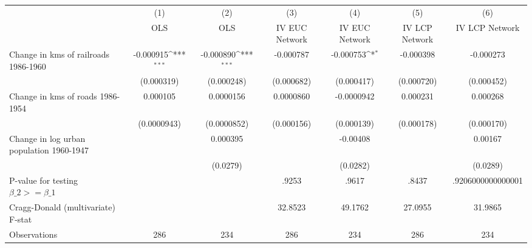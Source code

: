 {
\def\sym#1{\ifmmode^{#1}\else\(^{#1}\)\fi}
\begin{tabular}{l*{6}{c}}
\hline\hline
                &\multicolumn{1}{c}{(1)}&\multicolumn{1}{c}{(2)}&\multicolumn{1}{c}{(3)}&\multicolumn{1}{c}{(4)}&\multicolumn{1}{c}{(5)}&\multicolumn{1}{c}{(6)}\\
                &\multicolumn{1}{c}{OLS}&\multicolumn{1}{c}{OLS}&\multicolumn{1}{c}{IV EUC Network}&\multicolumn{1}{c}{IV EUC Network}&\multicolumn{1}{c}{IV LCP Network}&\multicolumn{1}{c}{IV LCP Network}\\
\hline
Change in kms of railroads 1986-1960&-0.000915\sym{***}&-0.000890\sym{***}&-0.000787         &-0.000753\sym{*}  &-0.000398         &-0.000273         \\
                &(0.000319)         &(0.000248)         &(0.000682)         &(0.000417)         &(0.000720)         &(0.000452)         \\
[1em]
Change in kms of roads 1986-1954& 0.000105         &0.0000156         &0.0000860         &-0.0000942         & 0.000231         & 0.000268         \\
                &(0.0000943)         &(0.0000852)         &(0.000156)         &(0.000139)         &(0.000178)         &(0.000170)         \\
[1em]
Change in log urban population 1960-1947&                  & 0.000395         &                  & -0.00408         &                  &  0.00167         \\
                &                  & (0.0279)         &                  & (0.0282)         &                  & (0.0289)         \\
\hline
P-value for testing $\beta\_{2} >= \beta\_{1}$&                  &                  &    .9253         &    .9617         &    .8437         &.9206000000000001         \\
Cragg-Donald (multivariate) F-stat&                  &                  &  32.8523         &  49.1762         &  27.0955         &  31.9865         \\
Observations    &      286         &      234         &      286         &      234         &      286         &      234         \\
\hline\hline
\end{tabular}
}
